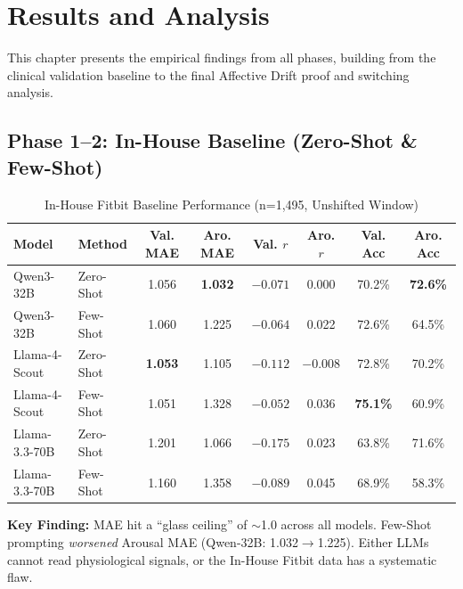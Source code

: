 \documentclass[11pt, a4paper]{report}
\begin{document}
\chapter{Results and Analysis}
\label{chap:results}

This chapter presents the empirical findings from all phases, building from the clinical validation baseline to the final Affective Drift proof and switching analysis.

\section{Phase 1--2: In-House Baseline (Zero-Shot \& Few-Shot)}
\label{sec:results-inhouse}

\begin{table}[H]
    \centering
    \small
    \caption{In-House Fitbit Baseline Performance (n=1,495, Unshifted Window)}
    \label{tab:inhouse-baseline}
    \begin{tabular}{@{}llcccccc@{}}
        \toprule
        \textbf{Model} & \textbf{Method} & \textbf{Val. MAE} & \textbf{Aro. MAE} & \textbf{Val. $r$} & \textbf{Aro. $r$} & \textbf{Val. Acc} & \textbf{Aro. Acc} \\
        \midrule
        Qwen3-32B & Zero-Shot & 1.056 & \textbf{1.032} & $-0.071$ & 0.000 & 70.2\% & \textbf{72.6\%} \\
        Qwen3-32B & Few-Shot & 1.060 & 1.225 & $-0.064$ & 0.022 & 72.6\% & 64.5\% \\
        Llama-4-Scout & Zero-Shot & \textbf{1.053} & 1.105 & $-0.112$ & $-0.008$ & 72.8\% & 70.2\% \\
        Llama-4-Scout & Few-Shot & 1.051 & 1.328 & $-0.052$ & 0.036 & \textbf{75.1\%} & 60.9\% \\
        Llama-3.3-70B & Zero-Shot & 1.201 & 1.066 & $-0.175$ & 0.023 & 63.8\% & 71.6\% \\
        Llama-3.3-70B & Few-Shot & 1.160 & 1.358 & $-0.089$ & 0.045 & 68.9\% & 58.3\% \\
        \bottomrule
    \end{tabular}
\end{table}

\textbf{Key Finding:} MAE hit a ``glass ceiling'' of $\sim$1.0 across all models. Few-Shot prompting \textit{worsened} Arousal MAE (Qwen-32B: 1.032$\rightarrow$1.225). Either LLMs cannot read physiological signals, or the In-House Fitbit data has a systematic flaw.
\end{document}
